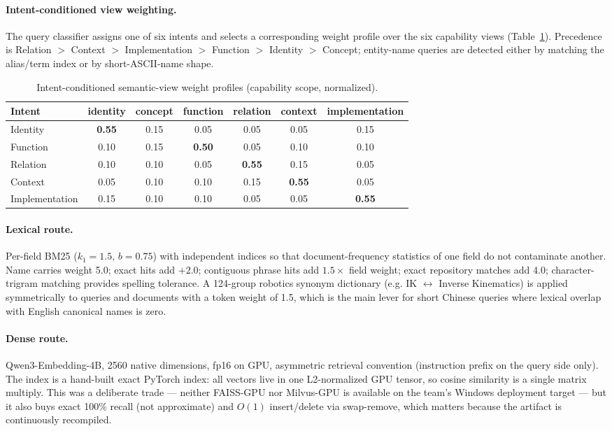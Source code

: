 \documentclass[10pt,a4paper]{article}
\begin{document}
\paragraph{Intent-conditioned view weighting.} The query classifier assigns one of
six intents and selects a corresponding weight profile over the six capability
views (Table~\ref{tab:weights}). Precedence is Relation $>$ Context $>$
Implementation $>$ Function $>$ Identity $>$ Concept; entity-name queries are
detected either by matching the alias/term index or by short-ASCII-name shape.

\begin{table}[htbp]
\centering\small
\caption{Intent-conditioned semantic-view weight profiles (capability scope, normalized).}
\label{tab:weights}
\begin{tabular}{@{}lcccccc@{}}
\toprule
Intent & identity & concept & function & relation & context & implementation \\
\midrule
Identity       & \textbf{0.55} & 0.15 & 0.05 & 0.05 & 0.05 & 0.15 \\
Function       & 0.10 & 0.15 & \textbf{0.50} & 0.05 & 0.10 & 0.10 \\
Relation       & 0.10 & 0.10 & 0.05 & \textbf{0.55} & 0.15 & 0.05 \\
Context        & 0.05 & 0.10 & 0.10 & 0.15 & \textbf{0.55} & 0.05 \\
Implementation & 0.15 & 0.10 & 0.10 & 0.05 & 0.05 & \textbf{0.55} \\
\bottomrule
\end{tabular}
\end{table}

\paragraph{Lexical route.} Per-field BM25 ($k_1{=}1.5$, $b{=}0.75$) with
independent indices so that document-frequency statistics of one field do not
contaminate another. Name carries weight 5.0; exact hits add $+2.0$; contiguous
phrase hits add $1.5\times$ field weight; exact repository matches add 4.0;
character-trigram matching provides spelling tolerance. A 124-group robotics
synonym dictionary (e.g. IK $\leftrightarrow$ Inverse Kinematics) is applied
symmetrically to queries and documents with a token weight of 1.5, which is the
main lever for short Chinese queries where lexical overlap with English canonical
names is zero.

\paragraph{Dense route.} Qwen3-Embedding-4B, 2560 native dimensions, fp16 on GPU,
asymmetric retrieval convention (instruction prefix on the query side only).
The index is a hand-built exact PyTorch index: all vectors live in one
L2-normalized GPU tensor, so cosine similarity is a single matrix multiply.
This was a deliberate trade --- neither FAISS-GPU nor Milvus-GPU is available on
the team's Windows deployment target --- but it also buys exact 100\% recall
(not approximate) and $O(1)$ insert/delete via swap-remove, which matters because
the artifact is continuously recompiled.
\end{document}
